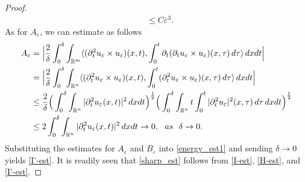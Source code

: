 \documentclass[10pt,a4paper]{amsart}
\newcommand{\eps}{\varepsilon}
\begin{document}
\begin{proof}
\begin{align*}
&\le C\eps^3.
\end{align*}
As for $A_\eps$, we can estimate as follows
\begin{align*}
A_\eps   
&=\Big|\frac{2}{\delta}\int_0^\delta
\int_{\mathbb{R}^m}\langle (\partial_t^2u_\eps\times 
u_\eps)(x,t), \int_0^t \partial_t(\partial_tu_\eps\times u_\eps)(x, \tau)\,d\tau\rangle\,dxdt\Big|\\
&=
\Big|\frac{2}{\delta}\int_0^\delta
\int_{\mathbb{R}^n}\langle (\partial_t^2u_\eps\times 
u_\eps)(x,t), \int_0^t (\partial_t^2u_\eps\times u_\eps)(x, \tau)\,d\tau\rangle\,dxdt\Big|\\
&\le \frac{2}{\delta}
\Big(\int_0^\delta
\int_{\mathbb{R}^n}|\partial_t^2u_\eps(x,t)|^2\,dxdt\Big)^\frac12
\Big(\int_0^\delta
\int_{\mathbb{R}^n}t\int_0^t|\partial_t^2u_\eps|^2(x,\tau)\,d\tau\,dxdt\Big)^\frac12\\
&\le 2\int_0^\delta
\int_{\mathbb{R}^n}|\partial_t^2u_\eps(x,t)|^2\,dxdt
\to 0,\ \ {\rm{as}}\ \ \delta\to 0.
\end{align*}
Substituting the estimates for $A_\eps$
and $B_\eps$ into \eqref{energy_est1} and sending $\delta\to 0$ yields
\eqref{I'-est}.
It is readily seen that \eqref{sharp_est}
follows from \eqref{I-est}, \eqref{H-est},
and \eqref{I'-est}.
\end{proof}
\end{document}
